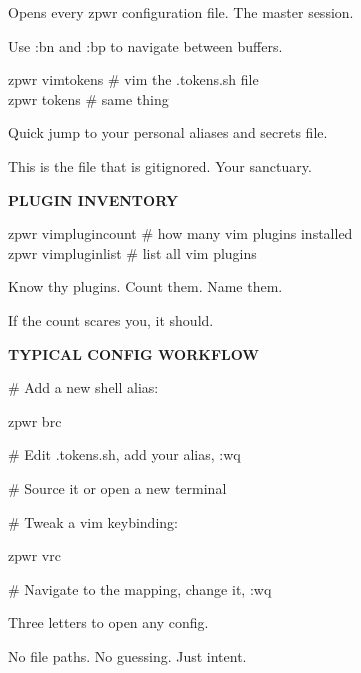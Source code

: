 \documentclass[11pt,a4paper,twoside]{book}
\begin{document}
Opens every zpwr configuration file. The master session.

Use :bn and :bp to navigate between buffers.

\begin{codebox}
zpwr vimtokens   \# vim the .tokens.sh file\\
zpwr tokens      \# same thing\\
\end{codebox}

Quick jump to your personal aliases and secrets file.

This is the file that is gitignored. Your sanctuary.


\vspace{12pt}
{\bfseries\color{neonyellow} PLUGIN INVENTORY}\vspace{4pt}

\begin{codebox}
zpwr vimplugincount  \# how many vim plugins installed\\
zpwr vimpluginlist   \# list all vim plugins\\
\end{codebox}

Know thy plugins. Count them. Name them.

If the count scares you, it should.


\vspace{12pt}
{\bfseries\color{neonyellow} TYPICAL CONFIG WORKFLOW}\vspace{4pt}

\# Add a new shell alias:

\begin{codebox}
zpwr brc\\
\end{codebox}

\# Edit .tokens.sh, add your alias, :wq

\# Source it or open a new terminal

\# Tweak a vim keybinding:

\begin{codebox}
zpwr vrc\\
\end{codebox}

\# Navigate to the mapping, change it, :wq

Three letters to open any config.

No file paths. No guessing. Just intent.


\vspace{16pt}
\end{document}
